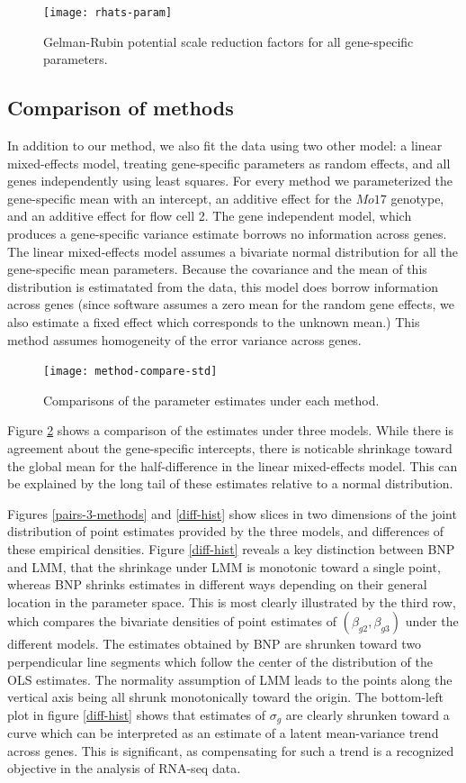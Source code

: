 \begin{figure}
\centering
\texttt{[image: rhats-param]}
\caption{Gelman-Rubin potential scale reduction factors for all gene-specific parameters.}
\label{rhat}
\end{figure}

\subsection{Comparison of methods}
In addition to our method, we also fit the data using two other model: a linear mixed-effects model, treating gene-specific parameters as random effects, and all genes independently using least squares. For every method we parameterized the gene-specific mean with an intercept, an additive effect for the $Mo17$ genotype, and an additive effect for flow cell 2. The gene independent model, which produces a gene-specific variance estimate borrows no information across genes. The linear mixed-effects model assumes a bivariate normal distribution for all the gene-specific mean parameters. Because the covariance and the mean of this distribution is estimatated from the data, this model does borrow information across genes (since software assumes a zero mean for the random gene effects, we also estimate a fixed effect which corresponds to the unknown mean.) This method assumes homogeneity of the error variance across genes.

\begin{figure}
\centering
\texttt{[image: method-compare-std]}
\caption{Comparisons of the parameter estimates under each method.}
\label{method-compare}
\end{figure}
Figure  \ref{method-compare} shows a comparison of the estimates under three models. While there is agreement about the gene-specific intercepts, there is noticable shrinkage toward the global mean for the half-difference in the linear mixed-effects model. This can be explained by the long tail of these estimates relative to a normal distribution.

Figures \ref{pairs-3-methods} and \ref{diff-hist} show slices in two dimensions of the joint distribution of point estimates provided by the three models, and differences of these empirical densities. Figure \ref{diff-hist} reveals a key distinction between BNP and LMM, that the shrinkage under LMM is monotonic toward a single point, whereas BNP shrinks estimates in different ways depending on their general location in the parameter space. This is most clearly illustrated by the third row, which compares the bivariate densities of point estimates of $(\beta_{g2},\beta_{g3})$ under the different models. The estimates obtained by BNP are shrunken toward two perpendicular line segments which follow the center of the distribution of the OLS estimates. The normality assumption of LMM leads to the points along the vertical axis being all shrunk monotonically toward the origin. The bottom-left plot in figure \ref{diff-hist} shows that estimates of $\sigma_g$ are clearly shrunken toward a curve which can be interpreted as an estimate of a latent mean-variance trend across genes. This is significant, as compensating for such a trend is a recognized objective in the analysis of RNA-seq data.

